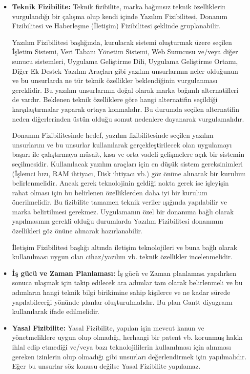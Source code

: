     \begin{itemize}
        \item \textbf{Teknik Fizibilite:} Teknik fizibilite, marka bağımsız teknik özelliklerin vurgulandığı bir çalışma olup kendi içinde Yazılım Fizibilitesi, Donanım Fizibilitesi ve Haberleşme (İletişim) Fizibilitesi şeklinde gruplanabilir.
        
Yazılım Fizibilitesi başlığında, kurulacak sistemi oluşturmak üzere seçilen İşletim Sistemi, Veri Tabanı Yönetim Sistemi, Web Sunucusu ve/veya diğer sunucu sistemleri, Uygulama Geliştirme Dili, Uygulama Geliştirme Ortamı, Diğer Ek Destek Yazılım Araçları gibi yazılım unsurlarının neler olduğunun ve bu unsurlarda ne tür teknik özellikler beklendiğinin vurgulanması gereklidir. Bu yazılım unsurlarının doğal olarak marka bağımlı alternatifleri de vardır. Beklenen teknik özelliklere göre hangi alternatifin seçildiği karşılaştırmalar yaparak ortaya konmalıdır. Bu durumda seçilen alternatifin neden diğerlerinden üstün olduğu somut nedenlere dayanarak vurgulamalıdır.

Donanım Fizibilitesinde hedef, yazılım fizibilitesinde seçilen yazılım unsurlarını ve bu unsurlar kullanılarak gerçekleştirilecek olan uygulamayı başarı ile çalıştırmaya müsait, kısa ve orta vadeli gelişmelere açık bir sistemin seçilmesidir. Kullanılacak yazılım araçları için en düşük sistem gereksinimleri (İşlemci hızı, RAM ihtiyacı, Disk ihtiyacı vb.) göz önüne alınarak bir kurulum belirlenmelidir. Ancak gerek teknolojinin geldiği nokta gerek ise işleyişin rahat olması için bu belirlenen özelliklerden daha iyi bir kurulum önerilmelidir. Bu fizibilite tamamen teknik veriler ışığında yapılabilir ve marka belirtilmesi gerekmez. Uygulamanın özel bir donanıma bağlı olarak yapılmasının gerekli olduğu durumlarda Yazılım Fizibilitesi donanımın özellikleri göz önüne alınarak hazırlanabilir.

İletişim Fizibilitesi başlığı altında iletişim teknolojileri ve buna bağlı olarak kullanılması uygun olan cihaz/yazılım vb. teknik özellikler incelenmelidir.
        \item \textbf{İş gücü ve Zaman Planlaması:} İş gücü ve Zaman planlaması yapılırken sonuca ulaşmak için takip edilecek ara adımlar tam olarak belirlenmeli ve bu adımların hangi teknik bilgi birikimine sahip kişilerce ve ne kadar sürede yapılabileceği yönünde planlar oluşturulmalıdır. Bu plan Gantt diyagramı kullanılarak ifade edilmelidir.
        
        \item \textbf{Yasal Fizibilite:} Yasal Fizibilite, yapılan işin mevcut kanun ve yönetmeliklere uygun olup olmadığı, herhangi bir patent vb. korunmuş hakkı ihlal edip etmediği ve/veya bazı teknolojililerin kullanılması için alınması gereken izinlerin olup olmadığı gibi unsurları değerlendirmek için yapılmalıdır. Eğer bu unsurlar söz konusu değilse Yasal Fizibilite yapılamaz.
        

\end{itemize}
